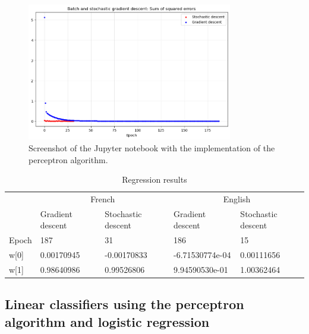 \documentclass[a4paper]{article}
\begin{document}
\begin{figure}
    \centering
    \includegraphics[width=0.8\textwidth]{figures/Regression errors.png}
    \caption{Screenshot of the Jupyter notebook with the implementation of the perceptron algorithm.}
    \label{fig:regression_French}
\end{figure}

\begin{table}[]
    \caption{Regression results}
    \label{tab:regression-table}
    \small
    \begin{tabular}{lllll}
        \hline\hline
             & \multicolumn{2}{c}{French}                    & \multicolumn{2}{c}{English}            \\
             & Gradient descent & Stochastic descent & Gradient descent & Stochastic descent \\
             \hline
    Epoch    & 187              & 31                 & 186              & 15                 \\
    w{[}0{]} & 0.00170945       & -0.00170833        & -6.71530774e-04  & 0.00111656         \\
    w{[}1{]} & 0.98640986       & 0.99526806         & 9.94590530e-01   & 1.00362464\\
    \hline\hline
    \end{tabular}
\end{table}


\subsection{Linear classifiers using the perceptron algorithm and logistic regression}
\end{document}
